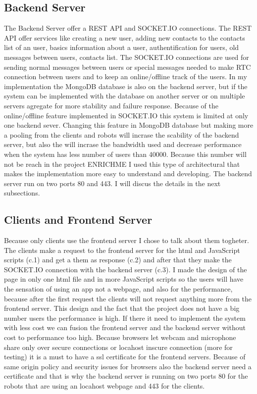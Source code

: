\subsection{Backend Server}
\label{sub-sec:callApp-backend}
The Backend Server offer a REST API and SOCKET.IO connections. The REST API offer services like
creating a new user, adding new contacts to the contacts list of an user, basics information about
a user, authentification for users, old messages between users, contacts list. The SOCKET.IO connections
are used for sending normal messages between users or special messages needed to make RTC connection
between users and to keep an online/offline track of the users. In my implementation the MongoDB
database is also on the backend server, but if the system can be implemented with the database
on another server or on multiple servers agregate for more stability and failure response. Because of
the online/offline feature implemented in SOCKET.IO this system is limited at only one backend sever.
Changing this feature in MongoDB database but making more a pooling from the clients and robots will
incrase the scability of the backend server, but also the will incrase the bandwidth used and
decrease performance when the system has less number of users than 40000. Because this number will
not be reach in the project ENRICHME I used this type of architectural that makes the implementation
more easy to understand and developing. The backend server run on two ports 80 and 443. I will discus
the details in the next subsections.


\subsection{Clients and Frontend Server}
\label{sub-sec:callApp-clients}
Because only clients use the frontend server I chose to talk about them togheter. The clients make
a request to the frontend server for the html and JavaScript scripts (c.1) and get a them as
response (c.2) and after that they make the SOCKET.IO connection with the backend server (c.3).
I made the design of the page in only one html file and in more JavaScript scripts so the users
will have the sensation of using an app not a webpage, and also for the performance, because after
the first request the clients will not request anything more from the frontend server. This design and
the fact that the project does not have a big number users the performance is high. If there it need to
implement the system with less cost we can fusion the frontend server and the backend server without 
cost to performance too high. Because browsers let webcam and microphone share only over secure connections
or locahost inscure connection (more for testing) it is a must to have a ssl certificate for the
frontend servers. Because of same origin policy and security issues for browsers also the backend
server need a certificate and that is why the backend server is running on two ports 80 for the robots
that are using an locahost webpage and 443 for the clients.


